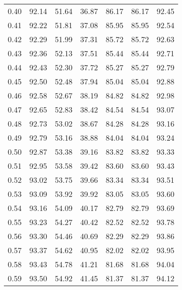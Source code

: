 \begin{tabular}{|c|c|c|c|c|c|c|}
      0.40 &     92.14 &     51.64 &      36.87 &   86.17 &      86.17 &         92.45 \\
      0.41 &     92.22 &     51.81 &      37.08 &   85.95 &      85.95 &         92.54 \\
      0.42 &     92.29 &     51.99 &      37.31 &   85.72 &      85.72 &         92.63 \\
      0.43 &     92.36 &     52.13 &      37.51 &   85.44 &      85.44 &         92.71 \\
      0.44 &     92.43 &     52.30 &      37.72 &   85.27 &      85.27 &         92.79 \\
      0.45 &     92.50 &     52.48 &      37.94 &   85.04 &      85.04 &         92.88 \\
      0.46 &     92.58 &     52.67 &      38.19 &   84.82 &      84.82 &         92.98 \\
      0.47 &     92.65 &     52.83 &      38.42 &   84.54 &      84.54 &         93.07 \\
      0.48 &     92.73 &     53.02 &      38.67 &   84.28 &      84.28 &         93.16 \\
      0.49 &     92.79 &     53.16 &      38.88 &   84.04 &      84.04 &         93.24 \\
      0.50 &     92.87 &     53.38 &      39.16 &   83.82 &      83.82 &         93.33 \\
      0.51 &     92.95 &     53.58 &      39.42 &   83.60 &      83.60 &         93.43 \\
      0.52 &     93.02 &     53.75 &      39.66 &   83.34 &      83.34 &         93.51 \\
      0.53 &     93.09 &     53.92 &      39.92 &   83.05 &      83.05 &         93.60 \\
      0.54 &     93.16 &     54.09 &      40.17 &   82.79 &      82.79 &         93.69 \\
      0.55 &     93.23 &     54.27 &      40.42 &   82.52 &      82.52 &         93.78 \\
      0.56 &     93.30 &     54.46 &      40.69 &   82.29 &      82.29 &         93.86 \\
      0.57 &     93.37 &     54.62 &      40.95 &   82.02 &      82.02 &         93.95 \\
      0.58 &     93.43 &     54.78 &      41.21 &   81.68 &      81.68 &         94.04 \\
      0.59 &     93.50 &     54.92 &      41.45 &   81.37 &      81.37 &         94.12 \\

\end{tabular}
